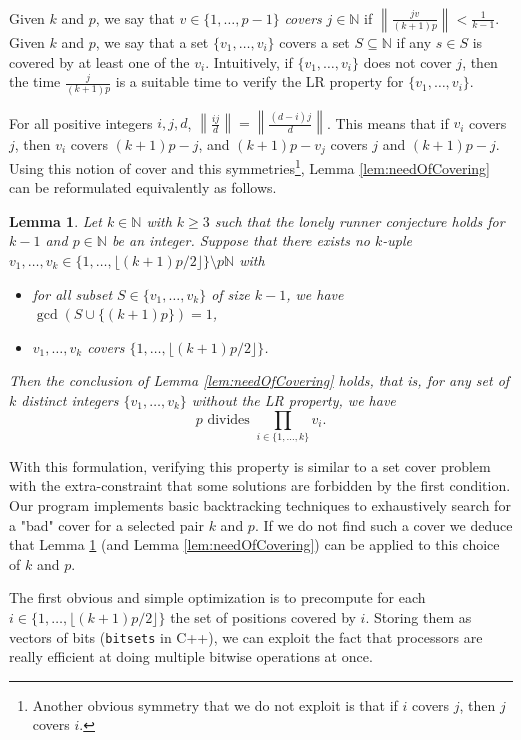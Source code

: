 \documentclass[11pt,a4paper]{article}
\newtheorem{lemma}[theorem]{Lemma}
\theoremstyle{definition}
\theoremstyle{remark}
\begin{document}
Given $k$ and $p$, we say that $v\in \{1,\ldots,p-1\}$ \emph{covers} $j\in\mathbb{N}$ if 
$\left\|\frac{jv}{(k+1)p}\right\|< \frac{1}{k-1}$. Given $k$ and $p$, we say that a set $\{v_1,\ldots,v_i\}$ covers a set $S\subseteq\mathbb{N}$ if any $s\in S$ is covered by at least one of the $v_i$. Intuitively, if $\{v_1,\ldots,v_i\}$ does not cover $j$, then the time $\frac{j}{(k+1)p}$ is a suitable time to verify the LR property for $\{v_1,\ldots,v_i\}$.

For all positive integers $i,j,d$, $\left\|\frac{ij}{d}\right\|=\left\|\frac{(d-i)j}{d}\right\|$. This means that if $v_i$ covers $j$, then $v_i$ covers $(k+1)p-j$, and $(k+1)p-v_j$ covers $j$ and $(k+1)p-j$.
Using this notion of cover and this symmetries\footnote{Another obvious symmetry that we do not exploit is that if $i$ covers $j$, then $j$ covers $i$.}, Lemma \ref{lem:needOfCovering} can be reformulated equivalently as follows.

\begin{lemma}\label{lem:reformulated}
Let $k\in \mathbb{N}$ with $k\ge3$ such that the lonely runner conjecture holds for $k-1$ and $p\in \mathbb{N}$ be an integer.
Suppose that  there exists no $k$-uple $v_1,\ldots, v_k\in \{1,\ldots, \lfloor(k+1)p/2\rfloor\}\setminus p\mathbb{N}$ with
\begin{itemize}
\item for all subset $S\in \{v_1,\ldots, v_k\}$ of size $k-1$, we have $\gcd(S\cup\{(k+1)p\})=1$,
\item $v_1,\ldots, v_k$ covers $\{1,\ldots, \lfloor(k+1)p/2\rfloor\}$.
\end{itemize} 
Then the conclusion of Lemma \ref{lem:needOfCovering} holds, that is,  for any set of $k$ distinct integers $\{v_1, \ldots, v_k\}$ without the LR property, we have 
  \[
 p \text{ divides } \prod_{i\in \{1,\ldots, k\}}v_i.
  \]
\end{lemma}
With this formulation, verifying this property is similar to a set cover problem with the extra-constraint that some solutions are forbidden by the first condition. Our program implements basic backtracking techniques to exhaustively search for a "bad" cover for a selected pair $k$ and $p$. If we do not find such a cover we deduce that Lemma \ref{lem:reformulated} (and Lemma \ref{lem:needOfCovering}) can be applied to this choice of $k$ and $p$.

The first obvious and simple optimization is to precompute for each $i\in \{1,\ldots, \lfloor(k+1)p/2\rfloor\}$ the set of positions covered by $i$. Storing them as vectors of bits (\verb!bitsets! in C++), we can exploit the fact that processors are really efficient at doing multiple bitwise operations at once. 
\end{document}
